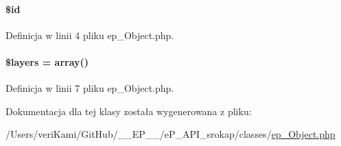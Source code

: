 \hypertarget{classep___object_ae97941710d863131c700f069b109991e}{
\paragraph[{\$id}]{\setlength{\rightskip}{0pt plus 5cm}\$id}}\label{classep___object_ae97941710d863131c700f069b109991e}


Definicja w linii 4 pliku ep\-\_\-\-Object.\-php.

\hypertarget{classep___object_a56b31ecb84a0f78f558158981557e0dd}{
\paragraph[{\$layers}]{\setlength{\rightskip}{0pt plus 5cm}\$layers = array()}}\label{classep___object_a56b31ecb84a0f78f558158981557e0dd}


Definicja w linii 7 pliku ep\-\_\-\-Object.\-php.



Dokumentacja dla tej klasy została wygenerowana z pliku\-:\begin{DoxyCompactItemize}
\item 
/\-Users/veri\-Kami/\-Git\-Hub/\-\_\-\-\_\-\-E\-P\-\_\-\-\_\-/e\-P\-\_\-\-A\-P\-I\-\_\-srokap/classes/\hyperlink{ep___object_8php}{ep\-\_\-\-Object.\-php}\end{DoxyCompactItemize}
